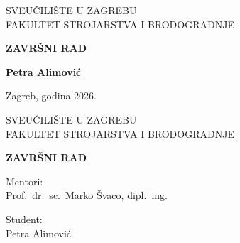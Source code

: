\documentclass[12pt,a4paper,oneside]{report}
\begin{document}
\renewcommand{\contentsname}{SADRŽAJ}
\renewcommand{\listfigurename}{POPIS SLIKA}
\renewcommand{\listtablename}{POPIS TABLICA}
\renewcommand{\bibname}{LITERATURA}

\pagestyle{empty}

\begin{center}
  {\fontsize{16}{19}\selectfont SVEUČILIŠTE U ZAGREBU\\[2pt]
   FAKULTET STROJARSTVA I BRODOGRADNJE}
\end{center}

\vspace{2.4cm}

\begin{center}
  {\bfseries\fontsize{28}{34}\selectfont ZAVRŠNI RAD}
\end{center}

\vspace{2cm}

\begin{flushright}
  {\bfseries\fontsize{14}{17}\selectfont Petra Alimović}
\end{flushright}

\vfill

\begin{center}
  {\fontsize{14}{17}\selectfont Zagreb, godina 2026.}
\end{center}

\clearpage

\begin{center}
  {\fontsize{16}{19}\selectfont SVEUČILIŠTE U ZAGREBU\\[2pt]
   FAKULTET STROJARSTVA I BRODOGRADNJE}
\end{center}

\vspace{2.4cm}

\begin{center}
  {\bfseries\fontsize{28}{34}\selectfont ZAVRŠNI RAD}
\end{center}

\vspace{2cm}

\noindent
\begin{minipage}[t]{0.5\textwidth}
  {\fontsize{14}{17}\selectfont Mentori:}\\[6pt]
  {\fontsize{14}{17}\selectfont
   Prof.\ dr.\ sc.\ Marko Švaco, dipl.\ ing.}
\end{minipage}%
\begin{minipage}[t]{0.5\textwidth}\raggedleft
  {\fontsize{14}{17}\selectfont Student:}\\[6pt]
  {\fontsize{14}{17}\selectfont Petra Alimović}
\end{minipage}
\end{document}

